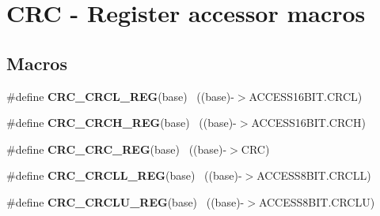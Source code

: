 \hypertarget{group___c_r_c___register___accessor___macros}{}\section{C\+R\+C -\/ Register accessor macros}
\label{group___c_r_c___register___accessor___macros}
\subsection*{Macros}
\begin{DoxyCompactItemize}
\item 
\hypertarget{group___c_r_c___register___accessor___macros_gabad31d8dfe12ca85567b1e6b9027ff66}{}\#define {\bfseries C\+R\+C\+\_\+\+C\+R\+C\+L\+\_\+\+R\+E\+G}(base)                                          ~((base)-\/$>$A\+C\+C\+E\+S\+S16\+B\+I\+T.\+C\+R\+C\+L)\label{group___c_r_c___register___accessor___macros_gabad31d8dfe12ca85567b1e6b9027ff66}

\item 
\hypertarget{group___c_r_c___register___accessor___macros_ga25a983be1195cec12e80bd5fd70d6bdb}{}\#define {\bfseries C\+R\+C\+\_\+\+C\+R\+C\+H\+\_\+\+R\+E\+G}(base)                                          ~((base)-\/$>$A\+C\+C\+E\+S\+S16\+B\+I\+T.\+C\+R\+C\+H)\label{group___c_r_c___register___accessor___macros_ga25a983be1195cec12e80bd5fd70d6bdb}

\item 
\hypertarget{group___c_r_c___register___accessor___macros_ga8c19463133fc11b80ce6beaa0559b049}{}\#define {\bfseries C\+R\+C\+\_\+\+C\+R\+C\+\_\+\+R\+E\+G}(base)                                            ~((base)-\/$>$C\+R\+C)\label{group___c_r_c___register___accessor___macros_ga8c19463133fc11b80ce6beaa0559b049}

\item 
\hypertarget{group___c_r_c___register___accessor___macros_gadd29ee6c1be896d6a29e47087c6fc8c5}{}\#define {\bfseries C\+R\+C\+\_\+\+C\+R\+C\+L\+L\+\_\+\+R\+E\+G}(base)                                        ~((base)-\/$>$A\+C\+C\+E\+S\+S8\+B\+I\+T.\+C\+R\+C\+L\+L)\label{group___c_r_c___register___accessor___macros_gadd29ee6c1be896d6a29e47087c6fc8c5}

\item 
\hypertarget{group___c_r_c___register___accessor___macros_gac563a3cd40ed051f1580525b3d997196}{}\#define {\bfseries C\+R\+C\+\_\+\+C\+R\+C\+L\+U\+\_\+\+R\+E\+G}(base)                                        ~((base)-\/$>$A\+C\+C\+E\+S\+S8\+B\+I\+T.\+C\+R\+C\+L\+U)\label{group___c_r_c___register___accessor___macros_gac563a3cd40ed051f1580525b3d997196}


\end{DoxyCompactItemize}

